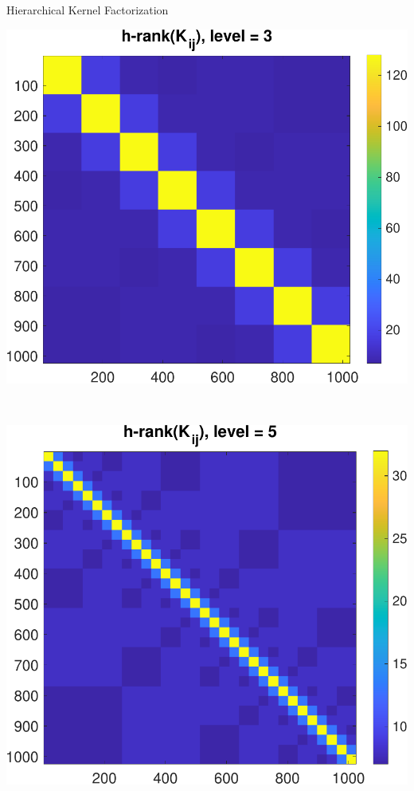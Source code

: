 \documentclass[aspectratio=169]{beamer}
\begin{document}
\begin{frame}{Hierarchical Kernel Factorization}
  \centering
  \begin{minipage}{0.45\textwidth}
    \centering
    \includegraphics[width=\linewidth]{../figures/kernel_h_rank_3.pdf}
  \end{minipage}
  ~
  \begin{minipage}{0.45\textwidth}
    \centering
    \includegraphics[width=\linewidth]{../figures/kernel_h_rank_5.pdf}
  \end{minipage}
\end{frame}
\end{document}
